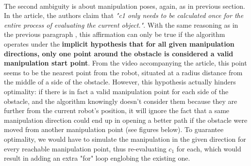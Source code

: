 \paragraph{} The second ambiguity is about manipulation poses, again, as in previous section. In the article, the authors claim that \textit{"c1 only needs to be calculated once for the entire process of evaluating the current object."}. With the same reasoning as in the previous paragraph , this affirmation can only be true if the algorithm operates under the \textbf{implicit hypothesis that for all given manipulation directions, only one point around the obstacle is considered a valid manipulation start point}. From the video  accompanying the article, this point seems to be the nearest point from the robot, situated at a radius distance from the middle of a side of the obstacle. However, this hypothesis actually hinders optimality: if there is in fact a valid manipulation point for each side of the obstacle, and the algorithm knowingly doesn't consider them because they are further from the current robot's position, it will ignore the fact that a same manipulation direction could end up in opening a better path if the obstacle were moved from another manipulation point (see figures below). To guarantee optimality, we would have to simulate the manipulation in the given direction for every reachable manipulation point, thus re-evaluating $c_{1}$ for each, which would result in adding an extra "for" loop englobing the existing one.

